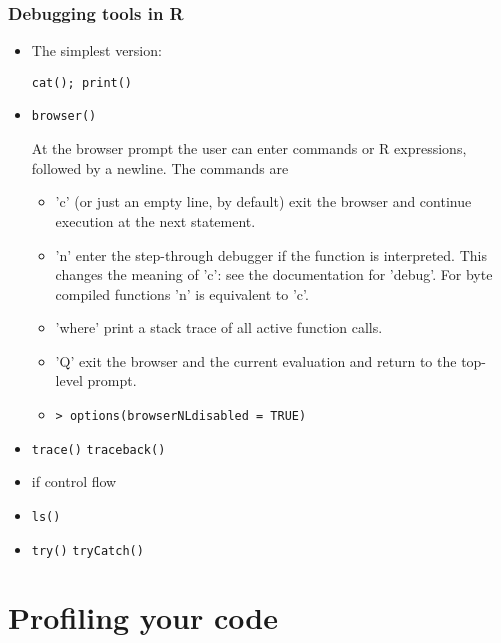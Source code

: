 \documentclass[10pt]{beamer}
\begin{document}
\begin{frame}
  \frametitle{Debugging tools in R}

  \begin{itemize}
  \item The simplest version:

    \texttt{cat(); print()}

  \item \texttt{browser()}

    At the browser prompt the user can enter commands or R
    expressions, followed by a newline.  The commands are

    \begin{itemize}
    \item 'c' (or just an empty line, by default) exit the browser and
      continue execution at the next statement.

    \item 'n' enter the step-through debugger if the function is
      interpreted.  This changes the meaning of 'c': see the
      documentation for 'debug'. For byte compiled functions 'n' is
      equivalent to 'c'.

    \item 'where' print a stack trace of all active function calls.

    \item 'Q' exit the browser and the current evaluation and return to
      the top-level prompt.

    \item \texttt{> options(browserNLdisabled = TRUE)}


    \end{itemize}

  \item \texttt{trace()} \texttt{traceback()}

  \item if control flow

  \item \texttt{ls()}

  \item \texttt{try()} \texttt{tryCatch()}

  \end{itemize}
\end{frame}


\section{Profiling your code}
\end{document}
